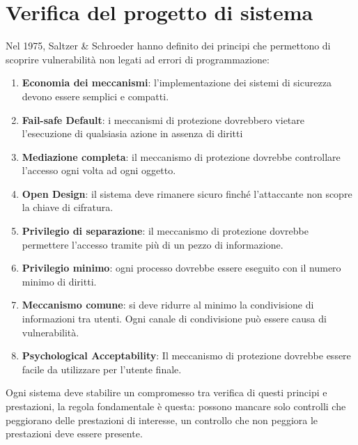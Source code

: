 \chapter{Verifica del progetto di sistema}
Nel 1975, Saltzer \& Schroeder hanno definito dei principi che permettono di scoprire vulnerabilità non legati ad
errori di programmazione:
\begin{enumerate}
	\item \textbf{Economia dei meccanismi}: l'implementazione dei sistemi di
	      sicurezza devono essere semplici e compatti.
	\item \textbf{Fail-safe Default}: i meccanismi di protezione dovrebbero
	      vietare l'esecuzione di qualsiasia azione in assenza di diritti
	\item \textbf{Mediazione completa}: il meccanismo di protezione dovrebbe
	      controllare l'accesso ogni volta ad ogni oggetto.
	\item \textbf{Open Design}: il sistema deve rimanere sicuro finché
	      l'attaccante non scopre la chiave di cifratura.
	\item \textbf{Privilegio di separazione}: il meccanismo di protezione
	      dovrebbe permettere l'accesso tramite più di un pezzo di
	      informazione.
	\item \textbf{Privilegio minimo}: ogni processo dovrebbe essere eseguito
	      con il numero minimo di diritti.
	\item \textbf{Meccanismo comune}: si deve ridurre al minimo la
	      condivisione di informazioni tra utenti. Ogni canale di
	      condivisione può essere causa di vulnerabilità.
	\item \textbf{Psychological Acceptability}: Il meccanismo di protezione dovrebbe essere facile da utilizzare
	      per l'utente finale.
\end{enumerate}
Ogni sistema deve stabilire un compromesso tra verifica di questi principi e prestazioni, la regola fondamentale è
questa: possono mancare solo controlli che peggiorano delle prestazioni di interesse, un controllo che non peggiora
le prestazioni deve essere presente.

